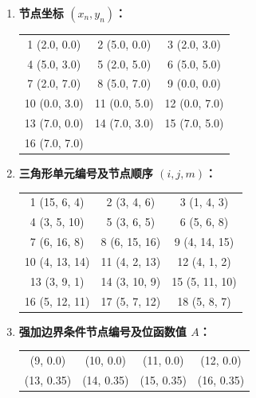 \documentclass[a4paper, 12pt]{article}
\begin{document}
\begin{enumerate}
    \item \textbf{节点坐标 $(x_n, y_n)$：}
    
    \begin{center}
    \begin{tabular}{ccc}
    1 (2.0, 0.0) & 2 (5.0, 0.0) & 3 (2.0, 3.0) \\
    4 (5.0, 3.0) & 5 (2.0, 5.0) & 6 (5.0, 5.0) \\
    7 (2.0, 7.0) & 8 (5.0, 7.0) & 9 (0.0, 0.0) \\
    10 (0.0, 3.0) & 11 (0.0, 5.0) & 12 (0.0, 7.0) \\
    13 (7.0, 0.0) & 14 (7.0, 3.0) & 15 (7.0, 5.0) \\
    16 (7.0, 7.0) & & \\
    \end{tabular}
    \end{center}

    \item \textbf{三角形单元编号及节点顺序 $(i, j, m)$：}
    
    \begin{center}
    \begin{tabular}{ccc}
    1 (15, 6, 4) & 2 (3, 4, 6) & 3 (1, 4, 3) \\
    4 (3, 5, 10) & 5 (3, 6, 5) & 6 (5, 6, 8) \\
    7 (6, 16, 8) & 8 (6, 15, 16) & 9 (4, 14, 15) \\
    10 (4, 13, 14) & 11 (4, 2, 13) & 12 (4, 1, 2) \\
    13 (3, 9, 1) & 14 (3, 10, 9) & 15 (5, 11, 10) \\
    16 (5, 12, 11) & 17 (5, 7, 12) & 18 (5, 8, 7) \\
    \end{tabular}
    \end{center}

    \item \textbf{强加边界条件节点编号及位函数值 $A$：}
    
    \begin{center}
    \begin{tabular}{cccc}
    (9, 0.0) & (10, 0.0) & (11, 0.0) & (12, 0.0) \\
    (13, 0.35) & (14, 0.35) & (15, 0.35) & (16, 0.35) \\
    \end{tabular}
    \end{center}
\end{enumerate}
\end{document}
